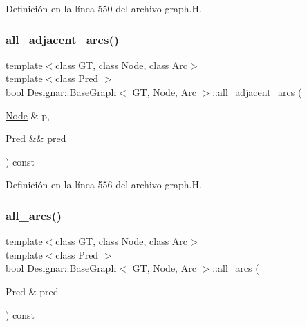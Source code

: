 Definición en la línea 550 del archivo graph.\+H.

\mbox{\label{class_designar_1_1_base_graph_aaae4400215b8ea6b55941875981c3892}} 
\subsubsection{\texorpdfstring{all\+\_\+adjacent\+\_\+arcs()}{all\_adjacent\_arcs()}\hspace{0.1cm}{\footnotesize\ttfamily [2/2]}}
{\footnotesize\ttfamily template$<$class GT, class Node, class Arc$>$ \\
template$<$class Pred $>$ \\
bool \hyperlink{class_designar_1_1_base_graph}{Designar\+::\+Base\+Graph}$<$ \hyperlink{demo-buildgraph_8_c_a3001c40d2c31ca87ed96cd7d1334a55e}{GT}, \hyperlink{namespace_designar_a5af326c65aa2bd26b26c410f2030d09e}{Node}, \hyperlink{namespace_designar_a3f55fb5513d62ff47cbc8f72b8e95d6f}{Arc} $>$\+::all\+\_\+adjacent\+\_\+arcs (\begin{DoxyParamCaption}\item[{\hyperlink{namespace_designar_a5af326c65aa2bd26b26c410f2030d09e}{Node} \&}]{p,  }\item[{Pred \&\&}]{pred }\end{DoxyParamCaption}) const\hspace{0.3cm}{\ttfamily [inline]}}



Definición en la línea 556 del archivo graph.\+H.

\mbox{\label{class_designar_1_1_base_graph_a3e2a55dafde6b1edf42f88f4c7d066b8}} 
\subsubsection{\texorpdfstring{all\+\_\+arcs()}{all\_arcs()}\hspace{0.1cm}{\footnotesize\ttfamily [1/2]}}
{\footnotesize\ttfamily template$<$class GT, class Node, class Arc$>$ \\
template$<$class Pred $>$ \\
bool \hyperlink{class_designar_1_1_base_graph}{Designar\+::\+Base\+Graph}$<$ \hyperlink{demo-buildgraph_8_c_a3001c40d2c31ca87ed96cd7d1334a55e}{GT}, \hyperlink{namespace_designar_a5af326c65aa2bd26b26c410f2030d09e}{Node}, \hyperlink{namespace_designar_a3f55fb5513d62ff47cbc8f72b8e95d6f}{Arc} $>$\+::all\+\_\+arcs (\begin{DoxyParamCaption}\item[{Pred \&}]{pred }\end{DoxyParamCaption}) const\hspace{0.3cm}{\ttfamily [inline]}}



